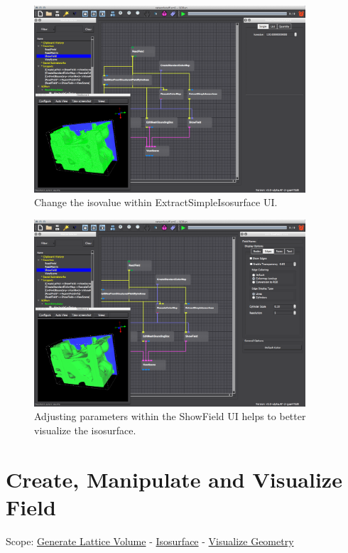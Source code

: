 \documentclass[fleqn,11pt,openany]{book}
\begin{document}
\begin{figure}[H]
\center
\includegraphics[width=0.9\textwidth]{BasicTutorial_figures/coloriso.png}
\caption{Change the isovalue within ExtractSimpleIsosurface UI.}
\label{fig:changeisoval}
\end{figure}

\begin{figure}[H]
\center
\includegraphics[width=0.9\textwidth]{BasicTutorial_figures/edgesiso.png}
\caption{Adjusting parameters within the ShowField UI helps to better visualize the isosurface.}
\label{fig:viewisosurf}
\end{figure}

\chapter{Create, Manipulate and Visualize Field}

\begin{introduction}
Scope: \hyperref[createfield]{Generate Lattice Volume} - \hyperref[isosurface2]{Isosurface} -
\hyperref[]{Visualize Geometry}
\end{introduction}
\end{document}

